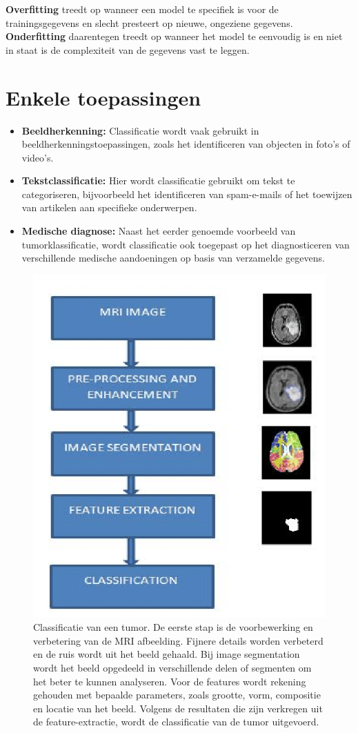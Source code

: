\documentclass[TeamE-eindrapport]{subfiles}
\begin{document}
\textbf{Overfitting} treedt op wanneer een model te specifiek is voor de trainingsgegevens en slecht presteert op nieuwe, ongeziene gegevens. \textbf{Onderfitting} daarentegen treedt op wanneer het model te eenvoudig is en niet in staat is de complexiteit van de gegevens vast te leggen.


\section{Enkele toepassingen}
\begin{itemize}
	\item \textbf{Beeldherkenning:} Classificatie wordt vaak gebruikt in beeldherkenningstoepassingen, zoals het identificeren van objecten in foto's of video's.
	
	\item \textbf{Tekstclassificatie:} Hier wordt classificatie gebruikt om tekst te categoriseren, bijvoorbeeld het identificeren van spam-e-mails of het toewijzen van artikelen aan specifieke onderwerpen.
	
	\item \textbf{Medische diagnose:} Naast het eerder genoemde voorbeeld van tumorklassificatie, wordt classificatie ook toegepast op het diagnosticeren van verschillende medische aandoeningen op basis van verzamelde gegevens.
	
\end{itemize}


\begin{figure}
	\centering
	\includegraphics[width=.5\textwidth]{tumor}
	\caption{Classificatie van een tumor. De eerste stap is de voorbewerking en verbetering van de MRI afbeelding. Fijnere details worden verbeterd en de ruis wordt uit het beeld gehaald. Bij image segmentation wordt het beeld opgedeeld in verschillende delen of segmenten om het beter te kunnen analyseren. Voor de features wordt rekening gehouden met bepaalde parameters, zoals grootte, vorm, compositie en locatie van het beeld. Volgens de resultaten die zijn verkregen uit de feature-extractie, wordt de classificatie van de tumor uitgevoerd.}
\end{figure}
\end{document}
